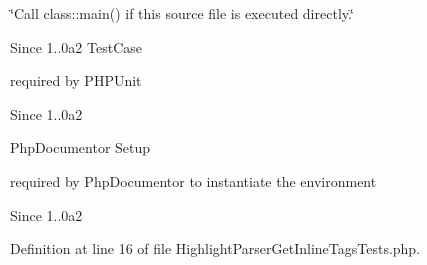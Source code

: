 \char`\"{}\-Call class\-::main() if this source file is executed directly.\char`\"{} \begin{DoxySince}{\-Since}
1..\-0a2 \-Test\-Case
\end{DoxySince}
required by \-P\-H\-P\-Unit \begin{DoxySince}{\-Since}
1..\-0a2
\end{DoxySince}
\-Php\-Documentor \-Setup

required by \-Php\-Documentor to instantiate the environment \begin{DoxySince}{\-Since}
1..\-0a2 
\end{DoxySince}


\-Definition at line 16 of file \-Highlight\-Parser\-Get\-Inline\-Tags\-Tests.\-php.

